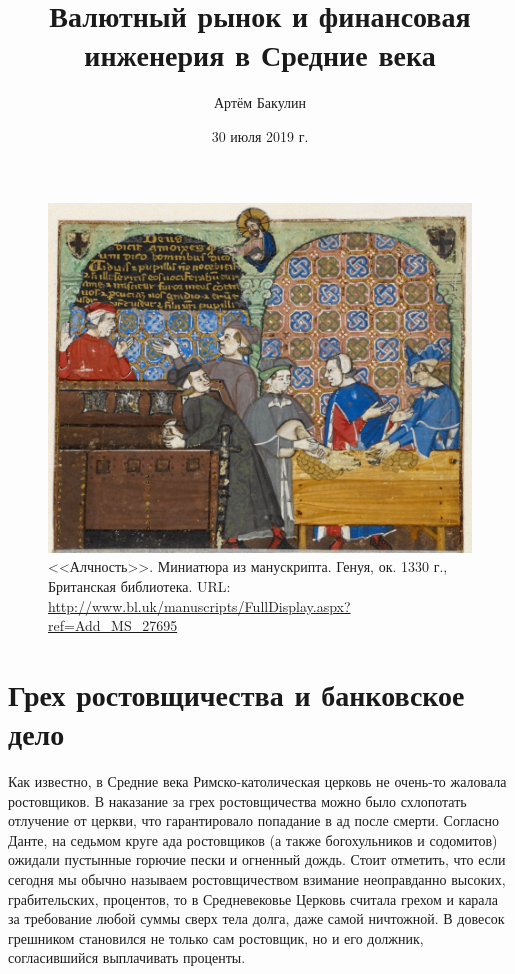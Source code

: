 \documentclass[a4paper,14pt]{extarticle}
\author{Артём Бакулин}
\date{30 июля 2019 г.}
\title{Валютный рынок и финансовая инженерия в Средние века}
\begin{document}
\maketitle

\begin{figure}[h]
\centering
\includegraphics[scale=0.5]{avarice.png}
\captionsetup{labelformat=empty}
\caption{<<Алчность>>. Миниатюра из манускрипта. Генуя, ок. 1330 г., Британская библиотека.
URL: \url{http://www.bl.uk/manuscripts/FullDisplay.aspx?ref=Add_MS_27695}}
\end{figure}

\section*{Грех ростовщичества и банковское дело}

Как известно, в Средние века Римско-католическая церковь не очень-то жаловала ростовщиков. В наказание за грех ростовщичества можно было схлопотать отлучение от церкви, что гарантировало попадание в ад после смерти. Согласно Данте, на седьмом круге ада ростовщиков (а также богохульников и содомитов) ожидали пустынные горючие пески и огненный дождь. Стоит отметить, что если сегодня мы обычно называем ростовщичеством взимание неоправданно высоких, грабительских, процентов, то в Средневековье Церковь считала грехом и карала за требование любой суммы сверх тела долга, даже самой ничтожной. В довесок грешником становился не только сам ростовщик, но и его должник, согласившийся выплачивать проценты.
\end{document}
